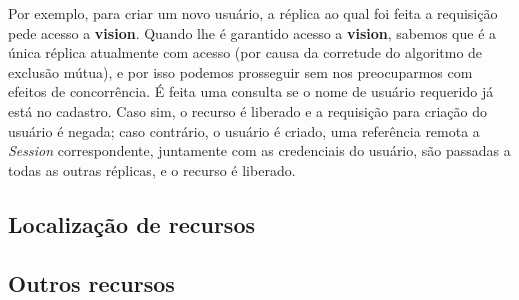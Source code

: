 \documentclass[../main.tex]{subfiles}
\begin{document}
Por exemplo, para criar um novo usuário, a réplica ao qual foi feita a requisição pede acesso a \textbf{vision}.
Quando lhe é garantido acesso a \textbf{vision}, sabemos que é a única réplica atualmente com acesso (por causa da corretude do algoritmo de exclusão mútua), e por isso podemos prosseguir sem nos preocuparmos com efeitos de concorrência.
É feita uma consulta se o nome de usuário requerido já está no cadastro.
Caso sim, o recurso é liberado e a requisição para criação do usuário é negada; caso contrário, o usuário é criado, uma referência remota a \textit{Session} correspondente, juntamente com as credenciais do usuário, são passadas a todas as outras réplicas, e o recurso é liberado.

\subsection{Localização de recursos}

\subsection{Outros recursos}
\end{document}
